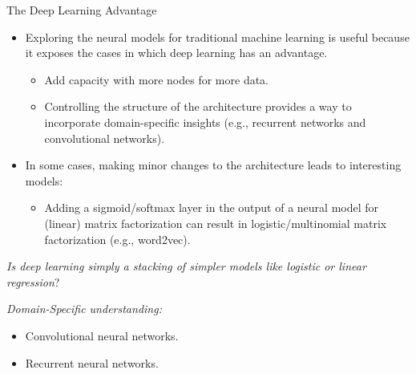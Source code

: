 \begin{frame}{The Deep Learning Advantage}
\begin{itemize}
\item Exploring the neural models for traditional machine learning
is useful because it exposes the cases in which deep learning has an
advantage.
\begin{itemize}
\item Add capacity with more nodes for more data.
\item Controlling the structure of the architecture provides a way
to incorporate domain-specific insights (e.g., recurrent networks
and convolutional networks).
\end{itemize}
\item In some cases, making minor changes to the architecture leads
to interesting models:
\begin{itemize}
\item Adding a sigmoid/softmax layer in the output of a neural model
for (linear) matrix factorization can result in logistic/multinomial
matrix factorization (e.g., word2vec).
\end{itemize}
\end{itemize}
\end{frame}


\begin{frame}{}
\centering
\begin{block}{}
\textit{Is deep learning simply a stacking of simpler models like logistic or linear regression}?
\end{block}
\end{frame}

\begin{frame}{}
\centering
\begin{block}{}
\textit{Domain-Specific understanding:}
\begin{itemize}
\item Convolutional neural networks.
\item Recurrent neural networks.
\end{itemize}
\end{block}
\end{frame}



